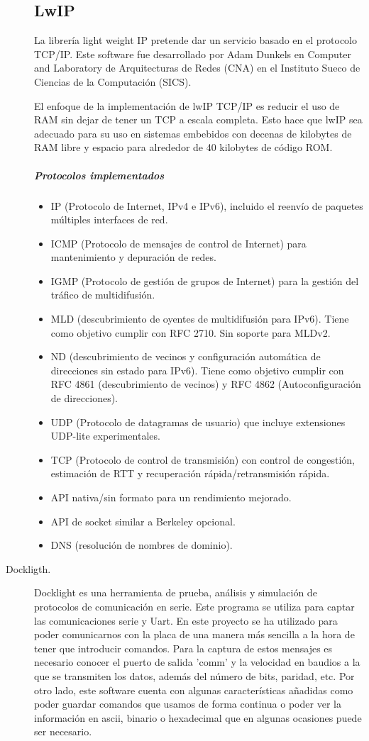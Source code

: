\begin{description}
\subsection{LwIP}
La librería light weight IP pretende dar un servicio basado en el protocolo TCP/IP. Este software fue desarrollado por Adam Dunkels en Computer and Laboratory de Arquitecturas de Redes (CNA) en el Instituto Sueco de Ciencias de la Computación (SICS).

El enfoque de la implementación de lwIP TCP/IP es reducir el uso de RAM sin dejar de tener un TCP a escala completa. Esto hace que lwIP sea adecuado para su uso en sistemas embebidos con decenas de kilobytes de RAM libre y espacio para alrededor de 40 kilobytes de código ROM.

\subparagraph{Protocolos implementados}
\begin{itemize}
  \item IP (Protocolo de Internet, IPv4 e IPv6), incluido el reenvío de paquetes múltiples interfaces de red.
  \item ICMP (Protocolo de mensajes de control de Internet) para mantenimiento y depuración de redes.
  \item IGMP (Protocolo de gestión de grupos de Internet) para la gestión del tráfico de multidifusión.
  \item MLD (descubrimiento de oyentes de multidifusión para IPv6). Tiene como objetivo cumplir con RFC 2710. Sin soporte para MLDv2.
  \item ND (descubrimiento de vecinos y configuración automática de direcciones sin estado para IPv6).
    Tiene como objetivo cumplir con RFC 4861 (descubrimiento de vecinos) y RFC 4862
    (Autoconfiguración de direcciones).
  \item UDP (Protocolo de datagramas de usuario) que incluye extensiones UDP-lite experimentales.
  \item TCP (Protocolo de control de transmisión) con control de congestión, estimación de RTT y recuperación rápida/retransmisión rápida.
  \item API nativa/sin formato para un rendimiento mejorado.
  \item API de socket similar a Berkeley opcional.
  \item DNS (resolución de nombres de dominio).
\end{itemize}

\item[Dockligth.]
Docklight \cite{DocklightDownload} es una herramienta de prueba, análisis y simulación de protocolos de comunicación en serie.
Este programa se utiliza para captar las comunicaciones serie y Uart. En este proyecto se ha utilizado para poder comunicarnos con la placa de una manera más sencilla a la hora de tener que introducir comandos. Para la captura de estos mensajes es necesario conocer el puerto de salida 'comm' y la velocidad en baudios a la que se transmiten los datos, además del número de bits, paridad, etc.
Por otro lado, este software cuenta con algunas características añadidas como poder guardar comandos que usamos de forma continua o poder ver la información en ascii, binario o hexadecimal que en algunas ocasiones puede ser necesario.


\end{description}
